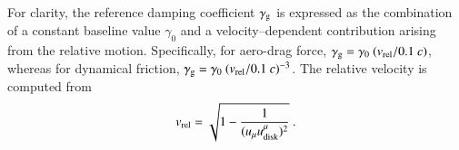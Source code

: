 \documentclass[aps,prx,reprint,superscriptaddress,nofootinbib,longbibliography]{revtex4-1}
\begin{document}
For clarity, the reference damping coefficient $\gamma_{\rm g}$ is expressed as the combination of a constant baseline value $\gamma_{0}$ and a velocity–dependent contribution arising from the relative motion. Specifically, for aero-drag force, $\gamma_{\rm g}=\gamma_{0}\ (v_{\rm rel}/0.1\ c)$, whereas for dynamical friction, $\gamma_{\rm g}=\gamma_{0}\ (v_{\rm rel}/0.1\ c)^{-3}$. The relative velocity is computed from 
\begin{equation}
    v_{\rm rel}=\sqrt{1-\frac{1}{(u_{ \mu}u^{\mu}_{\rm disk})^2}} \ .
\end{equation}
\end{document}

